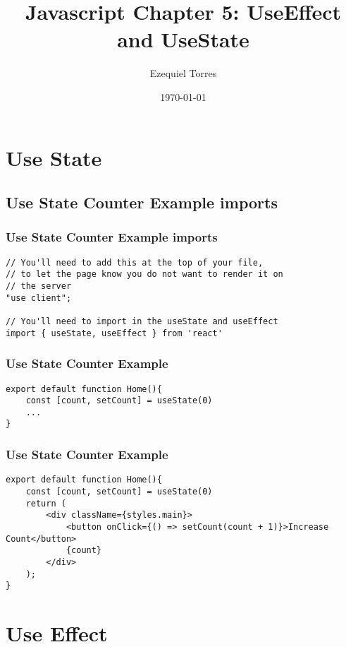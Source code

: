 \documentclass{beamer}
\begin{document}
\title{Javascript Chapter 5: UseEffect and UseState}
\author{Ezequiel Torres}
\date{\today}
\frame{\titlepage}

\section{Use State}


\fontsize{9pt}{10pt}\selectfont
\subsection{Use State Counter Example imports}
\begin{frame}[fragile]
\frametitle{Use State Counter Example imports}
\begin{lstlisting}
// You'll need to add this at the top of your file, 
// to let the page know you do not want to render it on
// the server
"use client";

// You'll need to import in the useState and useEffect
import { useState, useEffect } from 'react'
\end{lstlisting}
\end{frame}

\begin{frame}[fragile]
\frametitle{Use State Counter Example}
\begin{lstlisting}
export default function Home(){
    const [count, setCount] = useState(0)
    ...
}
\end{lstlisting}
\end{frame}


\fontsize{6pt}{6pt}\selectfont
\begin{frame}[fragile]
\frametitle{Use State Counter Example}
\begin{lstlisting}
export default function Home(){
    const [count, setCount] = useState(0)
    return (
        <div className={styles.main}>
            <button onClick={() => setCount(count + 1)}>Increase Count</button>
            {count}
        </div>
    );
}
\end{lstlisting}
\end{frame}

\fontsize{11pt}{11pt}\selectfont
\section{Use Effect}
\end{document}
